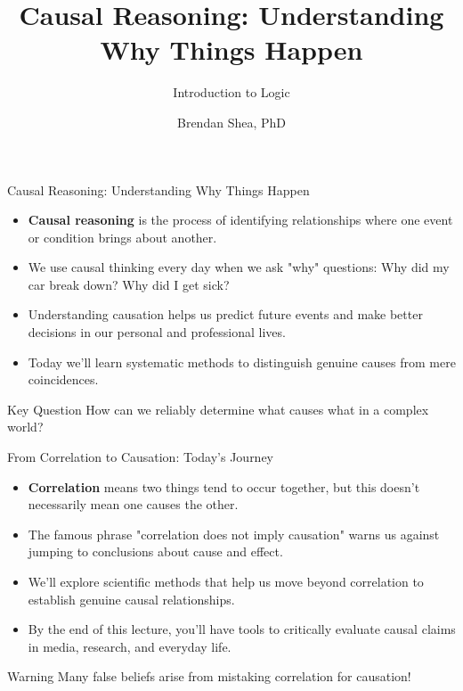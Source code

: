 \documentclass{beamer}
\title{Causal Reasoning: Understanding Why Things Happen}
\subtitle{Introduction to Logic}
\author{Brendan Shea, PhD}
\date{}
\begin{document}
	
	\frame{\titlepage}
	
	\begin{frame}{Causal Reasoning: Understanding Why Things Happen}
		\begin{itemize}
			\item \textbf{Causal reasoning} is the process of identifying relationships where one event or condition brings about another.
			\item We use causal thinking every day when we ask "why" questions: Why did my car break down? Why did I get sick?
			\item Understanding causation helps us predict future events and make better decisions in our personal and professional lives.
			\item Today we'll learn systematic methods to distinguish genuine causes from mere coincidences.
		\end{itemize}
		
		\begin{block}{Key Question}
			How can we reliably determine what causes what in a complex world?
		\end{block}
	\end{frame}
	
	\begin{frame}{From Correlation to Causation: Today's Journey}
		\begin{itemize}
			\item \textbf{Correlation} means two things tend to occur together, but this doesn't necessarily mean one causes the other.
			\item The famous phrase "correlation does not imply causation" warns us against jumping to conclusions about cause and effect.
			\item We'll explore scientific methods that help us move beyond correlation to establish genuine causal relationships.
			\item By the end of this lecture, you'll have tools to critically evaluate causal claims in media, research, and everyday life.
		\end{itemize}
		
		\begin{alertblock}{Warning}
			Many false beliefs arise from mistaking correlation for causation!
		\end{alertblock}
	\end{frame}
	
\end{document}
